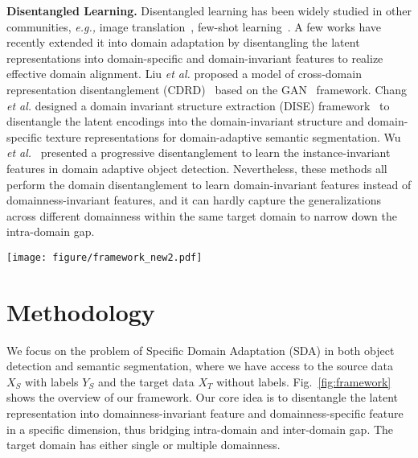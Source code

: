 \documentclass[10pt,journal,compsoc]{IEEEtran}
\begin{document}
\noindent \textbf{Disentangled Learning.} 
Disentangled learning has been widely studied in other communities, \emph{e.g.,} image translation~\cite{huang2018multimodal,lee2018diverse}, few-shot learning~\cite{ridgeway2018learning,scott2018adapted}. 
A few works have recently extended it into domain adaptation by disentangling the latent representations into domain-specific and domain-invariant features to realize effective domain alignment. 
Liu \emph{et al.} proposed a model of cross-domain representation disentanglement (CDRD)~\cite{liu2018detach} based on the GAN~\cite{GAN} framework. Chang \emph{et al.} designed a domain invariant structure extraction (DISE) framework~\cite{DISE} to disentangle the latent encodings into the domain-invariant structure and domain-specific texture representations for domain-adaptive semantic segmentation. Wu \emph{et al.}~\cite{IID} presented a progressive disentanglement to learn the instance-invariant features in domain adaptive object detection. 
Nevertheless, these methods all perform the domain disentanglement to learn domain-invariant features instead of domainness-invariant features, and it
can hardly capture the generalizations across different domainness within the same target domain to narrow down the intra-domain gap.


\begin{figure*}[t]
\centering
\texttt{[image: figure/framework\_new2.pdf]}
\caption{Overview of the proposed Self-Adversarial Disentangling (SAD) framework for specific domain adaptation (SAD). Our Domainness Creator (DC) not only generates a diversified source image with random domainness, but also provides additional supervisory signals $d'_{gt}$ for guiding the feature disentangling. The encoder $E_{spf}$ and $E_{inv}$ are to extract the domainness-specific representations $z_{spf}$ and the domainness-invariant representations $z_{inv}$, respectively. With the guidance of the generated domainness, $E_{spf}$, $E_{inv}$ and SAR (Self-Adversarial Regularizer) work in an adversarial manner, \emph{i.e.,} two opposite loss functions, to disentangle the latent representations into $z_{spf}$ and  $z_{inv}$ (Best viewed in color). 
}
\label{fig:framework}
\end{figure*}




\section{Methodology}
We focus on the problem of Specific Domain Adaptation (SDA) in both object detection and semantic segmentation, where we have access to the source data $X_S$ with labels $Y_S$ and the target data $X_T$ without labels.  Fig.~\ref{fig:framework} shows the overview of our framework. Our core idea is to disentangle  the  latent  representation into  domainness-invariant feature and domainness-specific feature in a specific  dimension, thus bridging intra-domain and inter-domain gap. The target domain has either single or multiple domainness. 
\end{document}
